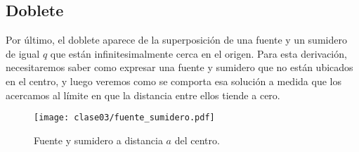 \subsection*{Doblete}
Por último, el doblete aparece de la superposición de una fuente y un sumidero de igual $q$ que están infinitesimalmente cerca en el origen.
Para esta derivación, necesitaremos saber como expresar una fuente y sumidero que no están ubicados en el centro, y luego veremos como se comporta esa solución a medida que los acercamos al límite en que la distancia entre ellos tiende a cero.

\begin{figure}[!h]
\centering
\texttt{[image: clase03/fuente\_sumidero.pdf]}
\caption{Fuente y sumidero a distancia $a$ del centro.}
\label{fig:fuente_sumidero}
\end{figure}
